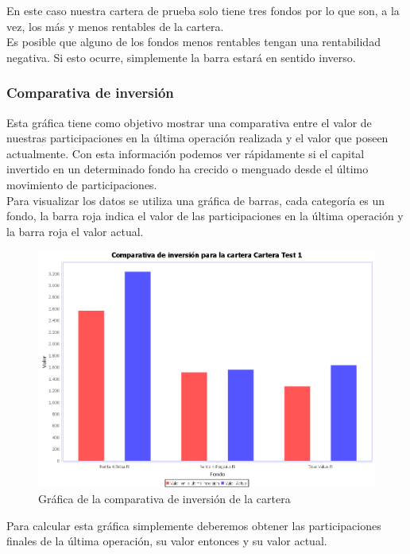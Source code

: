 \documentclass[12pt, a4paper]{article}
\begin{document}
En este caso nuestra cartera de prueba solo tiene tres fondos por lo que son, a la vez, los más y menos rentables de la cartera.\\

Es posible que alguno de los fondos menos rentables tengan una rentabilidad negativa. Si esto ocurre, simplemente la barra estará en sentido inverso.
	
\newpage
\subsubsection{Comparativa de inversión}

Esta gráfica tiene como objetivo mostrar una comparativa entre el valor de nuestras participaciones en la última operación realizada y el valor que poseen actualmente. Con esta información podemos ver rápidamente si el capital invertido en un determinado fondo ha crecido o menguado desde el último movimiento de participaciones.\\

Para visualizar los datos se utiliza una gráfica de barras, cada categoría es un fondo, la barra roja indica el valor de las participaciones en la última operación y la barra roja el valor actual.

	\begin{figure}[htbp]
	\centering
	\includegraphics[width=\textwidth]{figuras/comparativa.PNG}
	\caption{Gráfica de la comparativa de inversión de la cartera}
	\label{fig:comparativa}
	\end {figure}

Para calcular esta gráfica simplemente deberemos obtener las participaciones finales de la última operación, su valor entonces y su valor actual.\\ 
\end{document}
